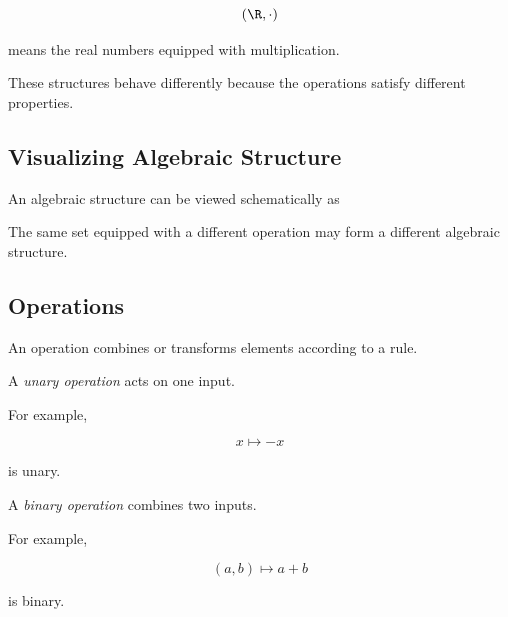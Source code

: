 \[ (\R,\cdot) \]

means the real numbers equipped with multiplication.

These structures behave differently because the operations satisfy different
properties.

\subsection{Visualizing Algebraic Structure}
\label{subsec:visualizing-algebraic-structure}

An algebraic structure can be viewed schematically as

\begin{center}
\end{center}

The same set equipped with a different operation may form a different
algebraic structure.

\subsection{Operations}
\label{subsec:abstract-operations}

An operation combines or transforms elements according to a rule.

A \emph{unary operation} acts on one input.

For example,

\[ x\mapsto -x \]

is unary.

A \emph{binary operation} combines two inputs.

For example,

\[ (a,b)\mapsto a+b \]

is binary.

